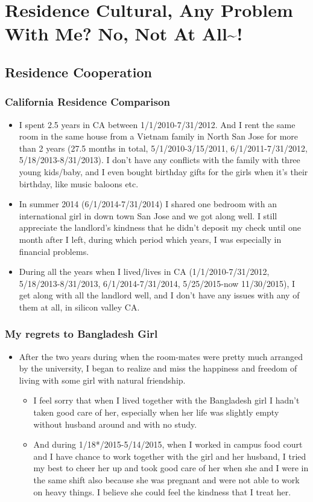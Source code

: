 \documentclass[9pt,b5paper]{article}
\begin{document}
\section{Residence Cultural, Any Problem With Me? No, Not At All\textasciitilde{}!}
\label{sec-3}
\subsection{Residence Cooperation}
\label{sec-3-1}
\subsubsection{California Residence Comparison}
\label{sec-3-1-1}
\begin{itemize}
\item I spent 2.5 years in CA between 1/1/2010-7/31/2012. And I rent the same room in the same house from a Vietnam family in North San Jose for more than 2 years (27.5 months in total, 5/1/2010-3/15/2011, 6/1/2011-7/31/2012, 5/18/2013-8/31/2013). I don't have any conflicts with the family with three young kids/baby, and I even bought birthday gifts for the girls when it's their birthday, like music baloons etc.
\item In summer 2014 (6/1/2014-7/31/2014) I shared one bedroom with an international girl in down town San Jose and we got along well. I still appreciate the landlord's kindness that he didn't deposit my check until one month after I left, during which period which years, I was especially in financial problems.
\item During all the years when I lived/lives in CA (1/1/2010-7/31/2012, 5/18/2013-8/31/2013, 6/1/2014-7/31/2014, 5/25/2015-now 11/30/2015), I get along with all the landlord well, and I don't have any issues with any of them at all, in silicon valley CA.
\end{itemize}
\subsubsection{My regrets to Bangladesh Girl}
\label{sec-3-1-2}
\begin{itemize}
\item After the two years during when the room-mates were pretty much arranged by the university, I began to realize and miss the happiness and freedom of living with some girl with natural friendship. 
\begin{itemize}
\item I feel sorry that when I lived together with the Bangladesh girl I hadn't taken good care of her, especially when her life was slightly empty without husband around and with no study.
\item And during 1/18*/2015-5/14/2015, when I worked in campus food court and I have chance to work together with the girl and her husband, I tried my best to cheer her up and took good care of her when she and I were in the same shift also because she was pregnant and were not able to work on heavy things. I believe she could feel the kindness that I treat her.
\end{itemize}
\end{itemize}
\end{document}
